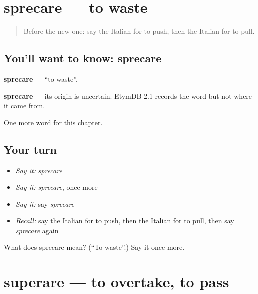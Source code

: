 \section[sprecare]{sprecare — to waste}

\label{lesson:IT-C240-sprecare}



\begin{quote}
Before the new one: say the Italian for to push, then the Italian for to pull.
\end{quote}

\subsection*{You'll want to know: sprecare}
\textbf{sprecare} — \textquotedblleft{}to waste\textquotedblright{}.

\begin{cousinweb}
\textbf{sprecare} — its origin is uncertain. EtymDB 2.1 records the word but not where it came from.
\end{cousinweb}

\begin{grammarlens}[title={What you've built}]
One more word for this chapter.
\end{grammarlens}

\subsection*{Your turn}
\begin{itemize}
\raggedright
  \item \emph{Say it:} \emph{sprecare}
  \item \emph{Say it:} \emph{sprecare}, once more
  \item \emph{Say it:} say \emph{sprecare}
  \item \emph{Recall:} say the Italian for to push, then the Italian for to pull, then say \emph{sprecare} again
\end{itemize}

\begin{tcolorbox}[breakable,colback=teal!4,colframe=teal!35!black,title={Before you move on}]
What does sprecare mean? (\textquotedblleft{}To waste\textquotedblright{}.) Say it once more.
\end{tcolorbox}
\section[superare]{superare — to overtake, to pass}

